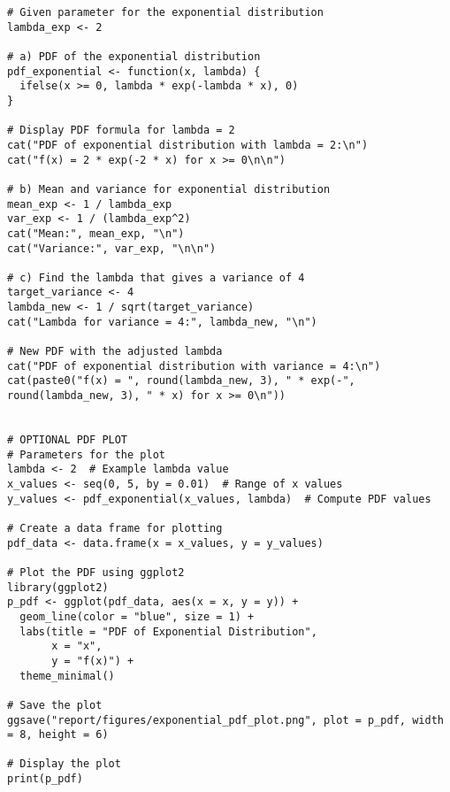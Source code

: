 \documentclass[12pt]{article}
\begin{document}
\begin{verbatim}
# Given parameter for the exponential distribution
lambda_exp <- 2

# a) PDF of the exponential distribution
pdf_exponential <- function(x, lambda) {
  ifelse(x >= 0, lambda * exp(-lambda * x), 0)
}

# Display PDF formula for lambda = 2
cat("PDF of exponential distribution with lambda = 2:\n")
cat("f(x) = 2 * exp(-2 * x) for x >= 0\n\n")

# b) Mean and variance for exponential distribution
mean_exp <- 1 / lambda_exp
var_exp <- 1 / (lambda_exp^2)
cat("Mean:", mean_exp, "\n")
cat("Variance:", var_exp, "\n\n")

# c) Find the lambda that gives a variance of 4
target_variance <- 4
lambda_new <- 1 / sqrt(target_variance)
cat("Lambda for variance = 4:", lambda_new, "\n")

# New PDF with the adjusted lambda
cat("PDF of exponential distribution with variance = 4:\n")
cat(paste0("f(x) = ", round(lambda_new, 3), " * exp(-", round(lambda_new, 3), " * x) for x >= 0\n"))


# OPTIONAL PDF PLOT
# Parameters for the plot
lambda <- 2  # Example lambda value
x_values <- seq(0, 5, by = 0.01)  # Range of x values
y_values <- pdf_exponential(x_values, lambda)  # Compute PDF values

# Create a data frame for plotting
pdf_data <- data.frame(x = x_values, y = y_values)

# Plot the PDF using ggplot2
library(ggplot2)
p_pdf <- ggplot(pdf_data, aes(x = x, y = y)) +
  geom_line(color = "blue", size = 1) +
  labs(title = "PDF of Exponential Distribution",
       x = "x",
       y = "f(x)") +
  theme_minimal()

# Save the plot
ggsave("report/figures/exponential_pdf_plot.png", plot = p_pdf, width = 8, height = 6)

# Display the plot
print(p_pdf)
\end{verbatim}
\end{document}
